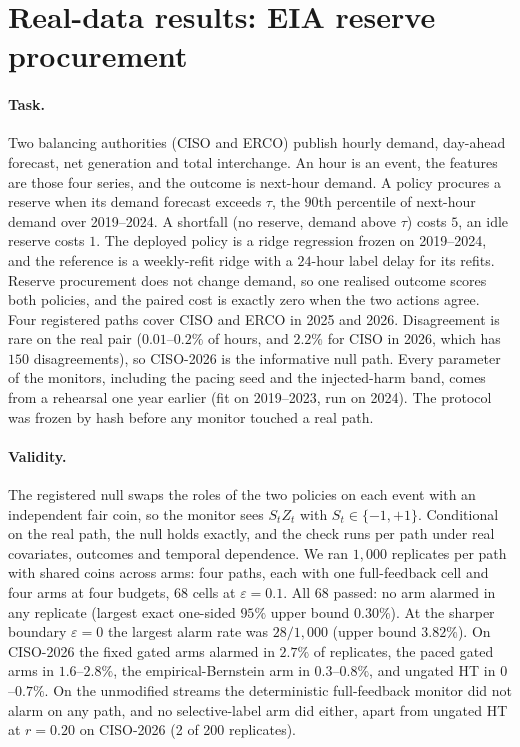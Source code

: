 
\section{Real-data results: EIA reserve procurement}\label{sec:eia}

\paragraph{Task.}
Two balancing authorities (CISO and ERCO) publish hourly demand, day-ahead forecast, net generation and total interchange.
An hour is an event, the features are those four series, and the outcome is next-hour demand. A policy procures a reserve when its demand forecast exceeds
$\tau$, the $90$th percentile of next-hour demand over 2019--2024. A shortfall (no reserve, demand above $\tau$) costs $5$, an idle reserve costs $1$.
The deployed policy is a ridge regression frozen on 2019--2024, and the reference is a weekly-refit ridge with a $24$-hour label delay for its refits.
Reserve procurement does not change demand, so one realised outcome scores both policies, and the paired cost is exactly zero when the two actions agree.
Four registered paths cover CISO and ERCO in 2025 and 2026. Disagreement is rare on the real pair ($0.01$--$0.2\%$ of hours, and $2.2\%$ for CISO in 2026, which has $150$ disagreements),
so CISO-2026 is the informative null path.
Every parameter of the monitors, including the pacing seed and the injected-harm band, comes from a rehearsal one year earlier (fit on 2019--2023, run on 2024).
The protocol was frozen by hash before any monitor touched a real path.

\paragraph{Validity.}
The registered null swaps the roles of the two policies on each event with an independent fair coin, so the monitor sees $S_tZ_t$ with $S_t\in\{-1,+1\}$.
Conditional on the real path, the null holds exactly, and the check runs per path under real covariates, outcomes and temporal dependence.
We ran $1{,}000$ replicates per path with shared coins across arms: four paths, each with one full-feedback cell and four arms at four budgets, $68$ cells at $\varepsilon=0.1$.
All $68$ passed: no arm alarmed in any replicate (largest exact one-sided $95\%$ upper bound $0.30\%$).
At the sharper boundary $\varepsilon=0$ the largest alarm rate was $28/1{,}000$ (upper bound $3.82\%$). On CISO-2026 the fixed gated arms alarmed in $2.7\%$ of replicates,
the paced gated arms in $1.6$--$2.8\%$, the empirical-Bernstein arm in $0.3$--$0.8\%$, and ungated HT in $0$--$0.7\%$.
On the unmodified streams the deterministic full-feedback monitor did not alarm on any path, and no selective-label arm did either, apart from ungated HT at $r=0.20$ on CISO-2026 (2 of 200 replicates).

